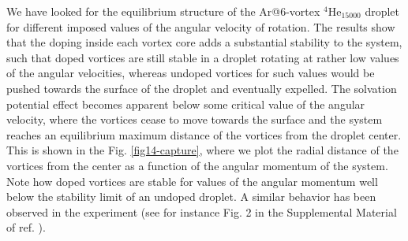 We have looked for the equilibrium structure of the Ar@6-vortex $^4$He$_{15000}$ droplet
for different imposed values of the angular velocity
of rotation. The results show that the doping inside each vortex core
adds a substantial stability to the system, such that doped vortices are still 
stable in a droplet rotating at rather low 
values of the angular velocities, whereas undoped vortices
for such values would be pushed towards the surface of the
droplet and eventually expelled.
The solvation potential effect becomes
apparent below some critical 
value of the angular velocity, where the vortices
cease to move towards the surface and the 
system reaches an equilibrium maximum distance
of the vortices from the droplet center.
This is shown in the  Fig. \ref{fig14-capture}, 
where we plot the radial distance of the vortices
from the center as a function of the angular momentum
of the system.
Note how doped vortices are stable for values
of the angular momentum well below the stability 
limit of an undoped droplet.
A similar behavior has been observed in the experiment (see for instance Fig. 2 in the
Supplemental Material of ref. \citep{Jon16}).


